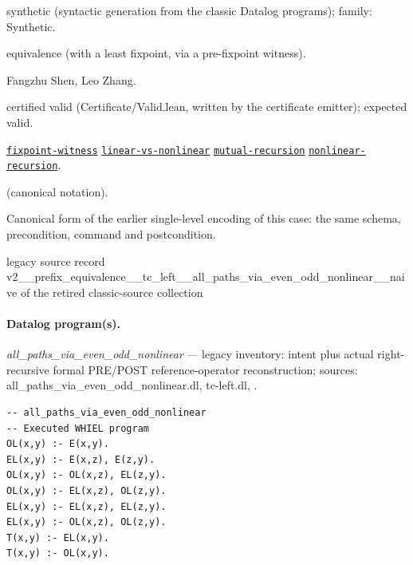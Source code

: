 \documentclass[10pt]{article}
\begin{document}
\begin{description}[leftmargin=2.6cm,style=nextline,itemsep=1pt]

\item[Category] synthetic (syntactic generation from the classic Datalog programs); family: Synthetic.

\item[Kind] equivalence (with a least fixpoint, via a pre-fixpoint witness).

\item[Contributors] Fangzhu Shen, Leo Zhang.

\item[Status] certified valid (Certificate/Valid.lean, written by the certificate emitter); expected valid.

\item[Tags] \hyperref[tag:fixpoint-witness]{\texttt{fixpoint-witness}} \hyperref[tag:linear-vs-nonlinear]{\texttt{linear-vs-nonlinear}} \hyperref[tag:mutual-recursion]{\texttt{mutual-recursion}} \hyperref[tag:nonlinear-recursion]{\texttt{nonlinear-recursion}}.

\item[Input]  (canonical notation).

\item[Summary] Canonical form of the earlier single-level encoding of this case: the same schema, precondition, command and postcondition.

\item[Sources] {\raggedright legacy source record v2\_\_prefix\_equivalence\_\_tc\_left\_\_all\_paths\_via\_even\_odd\_nonlinear\_\_naive of the retired classic-source collection\par}

\end{description}

\paragraph{Datalog program(s).}

{\raggedright\textit{all\_paths\_via\_even\_odd\_nonlinear} --- legacy inventory:  intent plus actual right-recursive formal PRE/POST reference-operator reconstruction; sources: all\_paths\_via\_even\_odd\_nonlinear.dl, tc-left.dl, .\par}

\begin{Verbatim}[fontsize=\scriptsize,breaklines=true,breakanywhere=true,frame=single,framesep=1.5mm]
-- all_paths_via_even_odd_nonlinear
-- Executed WHIEL program
OL(x,y) :- E(x,y).
EL(x,y) :- E(x,z), E(z,y).
OL(x,y) :- OL(x,z), EL(z,y).
OL(x,y) :- EL(x,z), OL(z,y).
EL(x,y) :- EL(x,z), EL(z,y).
EL(x,y) :- OL(x,z), OL(z,y).
T(x,y) :- EL(x,y).
T(x,y) :- OL(x,y).
\end{Verbatim}
\end{document}
